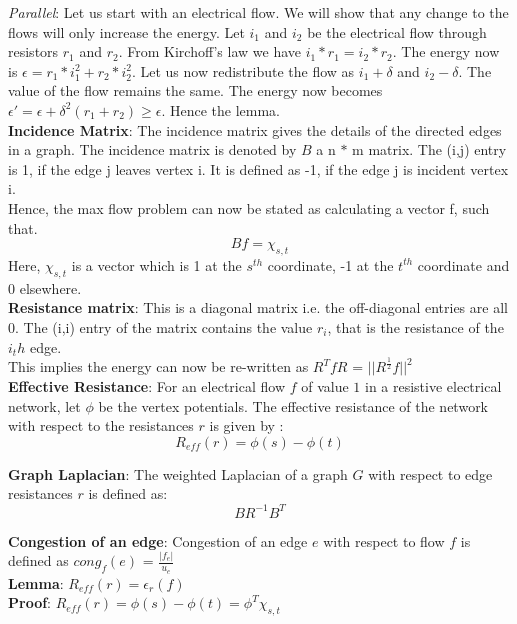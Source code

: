 \documentclass[a4paper,10pt]{article}
\newcommand{\eps}{\epsilon}
\begin{document}
	\textit{Parallel}:  Let us start with an electrical flow. We will show that any change to the flows will only increase the energy.
	Let $i_1$ and $i_2$ be the electrical flow through resistors $r_1$ and $r_2$. From Kirchoff's law we have $i_1 \ast r_1 = i_2 \ast r_2 $.
	The energy now is $\eps = r_1  \ast i_1^2 + r_2 \ast i_2^2$. Let us now redistribute the flow as $i_1 + \delta$ and $i_2 - \delta$. 
	The value of the flow remains the same. The energy now becomes $\eps' = \eps + \delta^2(r_1+r_2) \geq \eps$. Hence the lemma. \\
	
	\textbf{Incidence Matrix}: The incidence matrix gives the details of the directed edges in a graph. The incidence matrix is denoted
	by $B$ a n $\ast$ m matrix. The (i,j) entry is 1, if the edge j leaves vertex i. It is defined as -1, if the edge j is incident 
	vertex i. \\
	
	Hence, the max flow problem can now be stated as calculating a vector f, such that.
	$$Bf = \chi_{s,t}$$
	Here, $\chi_{s,t}$ is a vector which is 1 at the $s^{th}$ coordinate, -1 at the $t^{th}$ coordinate and 0 elsewhere. \\
	
	\textbf{Resistance matrix}:
	   This is a diagonal matrix i.e. the off-diagonal entries are all 0. The (i,i) entry of the matrix contains the value $r_i$, that is
	   the resistance of the $i_th$ edge. \\
	   
	   This implies the energy can now be re-written as $R^TfR$ = $||R^{\frac{1}{2}}f||^2$ \\
	   
	\textbf{Effective Resistance}: For an electrical flow $f$ of value $1$ in a resistive electrical network, let $\phi$ be the vertex potentials.
	The effective resistance of the network with respect to the resistances $r$ is given by : 
	$$R_{eff}(r) = \phi(s) - \phi(t)$$
	
	\textbf{Graph Laplacian}: The weighted Laplacian of a graph $G$ with respect to edge resistances $r$ is defined as:
	$$BR^{-1}B^T$$
	
	\textbf{Congestion of an edge}: Congestion of an edge $e$ with respect to flow $f$ is defined as $cong_f(e)$ = $\frac{|f_e|}{u_e}$ \\
	
	\textbf{Lemma}: $R_{eff}(r) = \eps_r(f)$ \\
	    
	\textbf{Proof}: $R_{eff}(r) = \phi(s) - \phi(t) = \phi^T \chi_{s,t}$ \\
	
\end{document}
